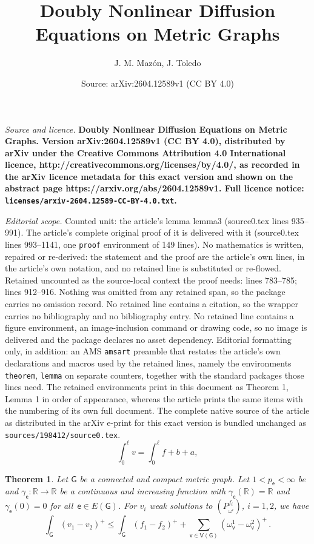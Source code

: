 \documentclass[10pt,a4paper]{amsart}
\title{\bf Doubly Nonlinear Diffusion Equations on Metric Graphs}
\author{J. M. Maz\'on, J. Toledo}
\date{Source: arXiv:2604.12589v1 (CC BY 4.0)}
\newtheorem{theorem}{Theorem}
\newcommand{\G}{\mathsf{G}}	%
\def\R{\mathbb R} %
\newcommand{\V}{\mathsf{V}}	%
\def\e{\mathsf{e}} 	%
\def\v{\mathsf{v}}	%
\begin{document}
\maketitle

\noindent\emph{Source and licence.} \bf Doubly Nonlinear Diffusion Equations on Metric Graphs. Version arXiv:2604.12589v1 (CC BY 4.0), distributed by arXiv under the Creative Commons Attribution 4.0 International licence, http://creativecommons.org/licenses/by/4.0/, as recorded in the arXiv licence metadata for this exact version and shown on the abstract page https://arxiv.org/abs/2604.12589v1. Full licence notice: \texttt{licenses/arxiv-2604.12589-CC-BY-4.0.txt}.\par\smallskip

\noindent\textit{Editorial scope.} Counted unit: the article's lemma lemma3 (source0.tex lines 935--991). The article's complete original proof of it is delivered with it (source0.tex lines 993--1141, one \texttt{proof} environment of 149 lines). No mathematics is written, repaired or re-derived: the statement and the proof are the article's own lines, in the article's own notation, and no retained line is substituted or re-flowed.  Retained uncounted as the source-local context the proof needs: lines 783--785; lines 912--916.  Nothing was omitted from any retained span, so the package carries no omission record.  No retained line contains a citation, so the wrapper carries no bibliography and no bibliography entry.  No retained line contains a figure environment, an image-inclusion command or drawing code, so no image is delivered and the package declares no asset dependency.  Editorial formatting only, in addition: an AMS \texttt{amsart} preamble that restates the article's own declarations and macros used by the retained lines, namely the environments \texttt{theorem}, \texttt{lemma} on separate counters, together with the standard packages those lines need.  The retained environments print in this document as Theorem 1, Lemma 1 in order of appearance, whereas the article prints the same items with the numbering of its own full document.  The complete native source of the article as distributed in the arXiv e-print for this exact version is bundled unchanged as \texttt{sources/198412/source0.tex}.
\begin{equation}\label{test1}
\int_0^{\ell} v =\int_0^{\ell} f  +  b + a,
\end{equation}

 \begin{theorem}\label{teocontprin001} Let  $\G$ be a  connected and compact metric graph.
  Let $1 < p_\e < \infty$ be and   $\gamma_\e:\R\to \R$ be a continuous and increasing function with $\gamma_\e(\mathbb{R})=\mathbb{R}$ and $\gamma_\e(0)=0$ for all~$\e \in E(\G)$.
   For $v_i$ weak solutions  to $(P_{\omega^i}^{f_i})$, $i=1,2$, we have  
$$\int_{\G}(v_1-v_2)^+\le \int_{\G}(f_1-f_2)^+ + \sum_{\v\in\V(\G)}(\omega^1_\v-\omega^2_\v)^+\,.$$
\end{theorem}
\end{document}
